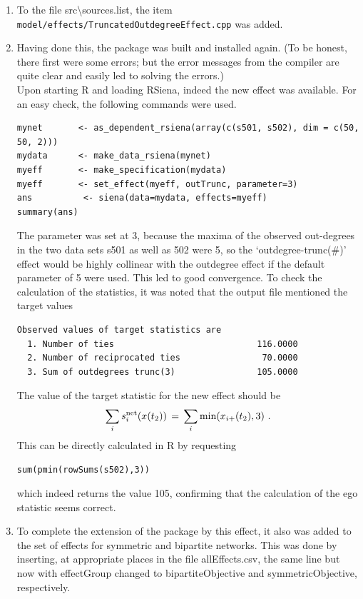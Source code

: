 \documentclass[a4paper,fleqn,11pt]{article}
\newcommand{\+}{\, + \,}
\newcommand{\sfn}[1]{\textsf{#1}}
\newcommand{\R}{{\sf R }}
\newcommand{\rs}{{\sf RSiena}}
\begin{document}
\begin{enumerate}
\item To the file \textsf{src{\textbackslash}sources.list}, the item
      \texttt{model/effects/TruncatedOutdegreeEffect.cpp} was added.
\item Having done this, the package was built and installed again.
      (To be honest, there first were some errors; but the error messages
       from the compiler are quite clear and easily led to solving
       the errors.)\\
      Upon starting \R and loading \rs, indeed the new effect  was
      available. For an easy check, the following commands
      were used.
{\small
\begin{verbatim}
mynet       <- as_dependent_rsiena(array(c(s501, s502), dim = c(50, 50, 2)))
mydata      <- make_data_rsiena(mynet)
myeff       <- make_specification(mydata)
myeff       <- set_effect(myeff, outTrunc, parameter=3)
ans          <- siena(data=mydata, effects=myeff)
summary(ans)
\end{verbatim}
}
      The parameter was set at 3, because the maxima of the
      observed out-degrees
      in the two data sets \sfn{s501} as well as \sfn{502} were 5,
      so the `outdegree-trunc(\#)' effect would be highly collinear with the
      outdegree effect if the default parameter of 5 were used.
      This led to good convergence. To check the calculation of the
      statistics, it was noted that the output file
      mentioned the target values
{\small
\begin{verbatim}
Observed values of target statistics are
  1. Number of ties                            116.0000
  2. Number of reciprocated ties                70.0000
  3. Sum of outdegrees trunc(3)                105.0000
\end{verbatim}
}
      The value of the target statistic for the new effect should be
      \[
       \sum_i s^{\rm net}_{i}(x(t_2)) \,=\,
                         \sum_i \text{min}(x_{i+}(t_2), 3) \ .
      \]
      This can be directly calculated in \R by requesting
\begin{verbatim}
sum(pmin(rowSums(s502),3))
\end{verbatim}
      which indeed returns the value 105, confirming that the calculation
      of the ego statistic seems correct.
\item To complete the extension of the package by this effect,
      it also was added to the set of effects for symmetric
      and bipartite networks.
      This was done by inserting, at appropriate places in the file
      \sfn{allEffects.csv},
      the same line but now with \sfn{effectGroup}
      changed to \sfn{bipartiteObjective} and \sfn{symmetricObjective},
      respectively.
\end{enumerate}
\end{document}
